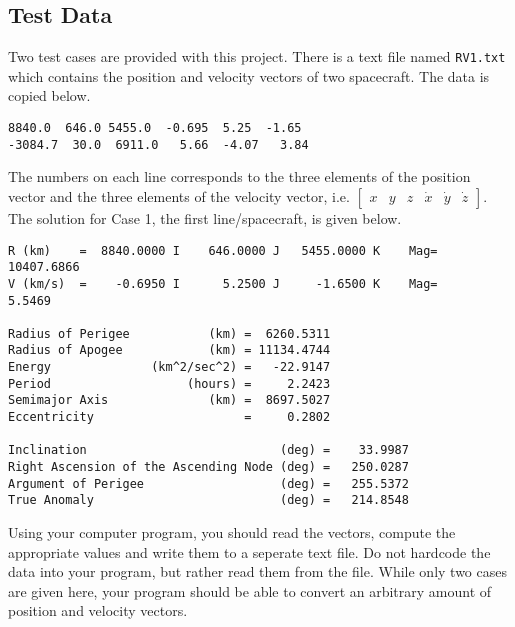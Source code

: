 \documentclass[11pt, reqno]{article}    %
\begin{document}
\subsection*{Test Data}
Two test cases are provided with this project. 
There is a text file named \texttt{RV1.txt} which contains the position and velocity vectors of two spacecraft. 
The data is copied below.
\begin{verbatim}
8840.0  646.0 5455.0  -0.695  5.25  -1.65
-3084.7  30.0  6911.0   5.66  -4.07   3.84 
\end{verbatim}
The numbers on each line corresponds to the three elements of the position vector and the three elements of the velocity vector, i.e. \(\begin{bmatrix} x & y & z & \dot{x} & \dot{y} & \dot{z} \end{bmatrix}\).
The solution for Case 1, the first line/spacecraft, is given below.
\begin{verbatim}
R (km)    =  8840.0000 I    646.0000 J   5455.0000 K    Mag= 10407.6866
V (km/s)  =    -0.6950 I      5.2500 J     -1.6500 K    Mag=     5.5469

Radius of Perigee           (km) =  6260.5311
Radius of Apogee            (km) = 11134.4744
Energy              (km^2/sec^2) =   -22.9147
Period                   (hours) =     2.2423
Semimajor Axis              (km) =  8697.5027
Eccentricity                     =     0.2802

Inclination                           (deg) =    33.9987
Right Ascension of the Ascending Node (deg) =   250.0287
Argument of Perigee                   (deg) =   255.5372
True Anomaly                          (deg) =   214.8548
\end{verbatim}

Using your computer program, you should read the vectors, compute the appropriate values and write them to a seperate text file.
Do not hardcode the data into your program, but rather read them from the file. 
While only two cases are given here, your program should be able to convert an arbitrary amount of position and velocity vectors.
\end{document}
